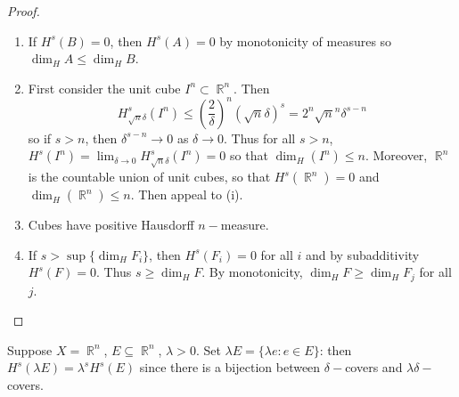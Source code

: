 \documentclass[11pt, a4paper]{memoir}
\DeclareMathOperator{\R}{{\mathbb{R}}}
\theoremstyle{change}
\theoremstyle{plain}
\theoremstyle{nonumberplain}
\newtheorem{proof}{Proof}
\numberwithin{equation}{section}
\begin{document}
\begin{proof}
    \begin{enumerate}[nl,r]
        \item If $H^s(B)=0$, then $H^s(A)=0$ by monotonicity of measures so $\dim_H A\leq\dim_H B$.
        \item First consider the unit cube $I^n\subset\R^n$.
            Then
            \begin{equation*}
                H^s_{\sqrt{n}\delta}(I^n)\leq\left(\frac{2}{\delta}\right)^n(\sqrt{n}\delta)^s=2^n\sqrt{n}^n\delta^{s-n}
            \end{equation*}
            so if $s>n$, then $\delta^{s-n}\to 0$ as $\delta\to 0$.
            Thus for all $s>n$, $H^s(I^n)=\lim_{\delta\to 0}H^s_{\sqrt{n}\delta}(I^n)=0$ so that $\dim_H(I^n)\leq n$.
            Moreover, $\R^n$ is the countable union of unit cubes, so that $H^s(\R^n)=0$ and $\dim_H(\R^n)\leq n$.
            Then appeal to (i).
        \item Cubes have positive Hausdorff $n-$measure.
        \item If $s>\sup\{\dim_H F_i\}$, then $H^s(F_i)=0$ for all $i$ and by subadditivity $H^s(F)=0$.
            Thus $s\geq\dim_H F$.
            By monotonicity, $\dim_H F\geq\dim_H F_j$ for all $j$.
    \end{enumerate}
\end{proof}
Suppose $X=\R^n$, $E\subseteq\R^n$, $\lambda>0$.
Set $\lambda E=\{\lambda e:e\in E\}$: then $H^s(\lambda E)=\lambda^s H^s(E)$ since there is a bijection between $\delta-$covers and $\lambda\delta-$covers.
\end{document}
